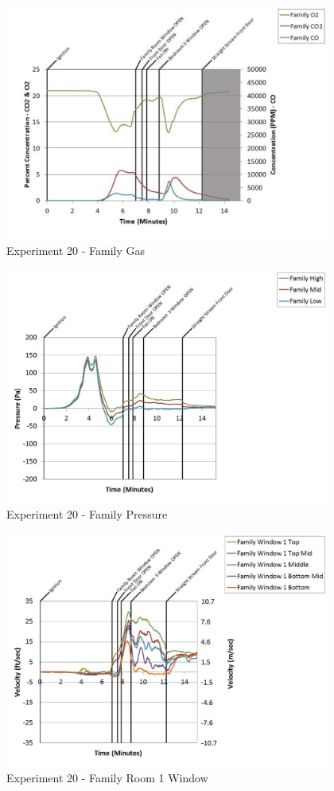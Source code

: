 \documentclass{article}
\begin{document}
\begin{appendices}
	\clearpage

	\begin{figure}[h!]
		\centering
		\includegraphics[height=3.05in]{0_Images/Results_Charts/Exp_20_Charts/FamilyGas.pdf}
		\caption{Experiment 20 - Family Gas}
	\end{figure}
 

	\begin{figure}[h!]
		\centering
		\includegraphics[height=3.05in]{0_Images/Results_Charts/Exp_20_Charts/FamilyPressure.pdf}
		\caption{Experiment 20 - Family Pressure}
	\end{figure}
 
	\clearpage

	\begin{figure}[h!]
		\centering
		\includegraphics[height=3.05in]{0_Images/Results_Charts/Exp_20_Charts/FamilyRoom1Window.pdf}
		\caption{Experiment 20 - Family Room 1 Window}
	\end{figure}
 


\end{appendices}
\end{document}
